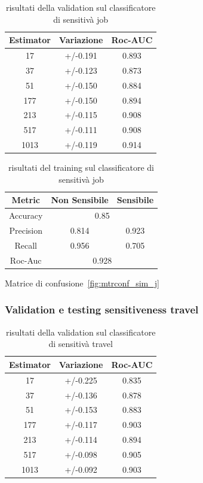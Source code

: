 \begin{table}[h]
\label{tbl:val_sens_job}
\centering
\begin{tabular}{|c|c|c|}
\hline
\textbf{Estimator} & \textbf{Variazione} & \textbf{Roc-AUC} \\ \hline
17 & +/-0.191 & 0.893 \\ \hline
37 & +/-0.123 & 0.873 \\ \hline
51 & +/-0.150 & 0.884 \\ \hline
177 & +/-0.150 & 0.894 \\ \hline
213 & +/-0.115 & 0.908 \\ \hline
517 & +/-0.111 & 0.908 \\ \hline
1013 & +/-0.119 & 0.914 \\ \hline
\end{tabular}
\caption{risultati della validation sul classificatore di sensitivà job}
\end{table}
\FloatBarrier

\begin{table}[h]
\label{tbl:training_sens_job}
\centering
\begin{tabular}{|c|c|c|}
\hline
\textbf{Metric} & \textbf{Non Sensibile} & \textbf{Sensibile} \\ \hline
Accuracy & \multicolumn{2}{c|}{0.85} \\ \hline
Precision & 0.814 & 0.923 \\ \hline
Recall & 0.956 & 0.705 \\ \hline
Roc-Auc & \multicolumn{2}{c|}{0.928} \\ \hline
\end{tabular}
\caption{risultati del training sul classificatore di sensitivà job}
\end{table}
\FloatBarrier

Matrice di confusione~\ref{fig:mtrconf_sim_j}

\subsubsection{Validation e testing sensitiveness travel}
\label{sssec:val_testing_travel}

\begin{table}[h]
\label{tbl:val_sens_travel}
\centering
\begin{tabular}{|c|c|c|}
\hline
\textbf{Estimator} & \textbf{Variazione} & \textbf{Roc-AUC} \\ \hline
17 & +/-0.225 & 0.835 \\ \hline
37 & +/-0.136 & 0.878 \\ \hline
51 & +/-0.153 & 0.883 \\ \hline
177 & +/-0.117 & 0.903 \\ \hline
213 & +/-0.114 & 0.894 \\ \hline
517 & +/-0.098 & 0.905 \\ \hline
1013 & +/-0.092 & 0.903 \\ \hline
\end{tabular}
\caption{risultati della validation sul classificatore di sensitivà travel}
\end{table}
\FloatBarrier

